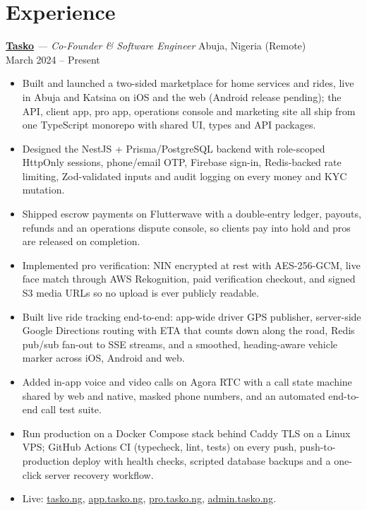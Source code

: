 \documentclass[10pt,a4paper]{article}
\newcommand{\role}[4]{%
    \noindent\textbf{#1} \textit{--- #2} \hfill \textcolor{primary!80}{#3} \\
    \textcolor{accent}{#4}\vspace{1pt}
}
\begin{document}
\section*{Experience}
\small
\role{\href{https://tasko.ng}{Tasko}}{Co-Founder \& Software Engineer}{Abuja, Nigeria (Remote)}{March 2024 -- Present}
\begin{itemize}
    \item Built and launched a two-sided marketplace for home services and rides, live in Abuja and Katsina on iOS and the web (Android release pending); the API, client app, pro app, operations console and marketing site all ship from one TypeScript monorepo with shared UI, types and API packages.
    \item Designed the NestJS + Prisma/PostgreSQL backend with role-scoped HttpOnly sessions, phone/email OTP, Firebase sign-in, Redis-backed rate limiting, Zod-validated inputs and audit logging on every money and KYC mutation.
    \item Shipped escrow payments on Flutterwave with a double-entry ledger, payouts, refunds and an operations dispute console, so clients pay into hold and pros are released on completion.
    \item Implemented pro verification: NIN encrypted at rest with AES-256-GCM, live face match through AWS Rekognition, paid verification checkout, and signed S3 media URLs so no upload is ever publicly readable.
    \item Built live ride tracking end-to-end: app-wide driver GPS publisher, server-side Google Directions routing with ETA that counts down along the road, Redis pub/sub fan-out to SSE streams, and a smoothed, heading-aware vehicle marker across iOS, Android and web.
    \item Added in-app voice and video calls on Agora RTC with a call state machine shared by web and native, masked phone numbers, and an automated end-to-end call test suite.
    \item Run production on a Docker Compose stack behind Caddy TLS on a Linux VPS; GitHub Actions CI (typecheck, lint, tests) on every push, push-to-production deploy with health checks, scripted database backups and a one-click server recovery workflow.
    \item Live: \href{https://tasko.ng}{tasko.ng}, \href{https://app.tasko.ng}{app.tasko.ng}, \href{https://pro.tasko.ng}{pro.tasko.ng}, \href{https://admin.tasko.ng}{admin.tasko.ng}.
\end{itemize}
\end{document}
